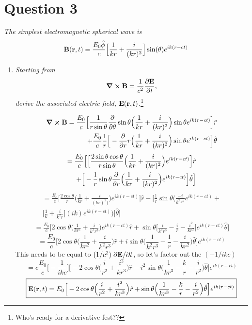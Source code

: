 \documentclass[12pt]{article}
\begin{document}
\begin{enumerate}[label=\alph*)]
\end{enumerate}

\newpage

\section*{Question 3}
{\sl The simplest electromagnetic spherical wave is}
\begin{equation}
\vb{B}(\vb{r}, t) = \frac{E_0 \hat{\phi}}{c}\Big[\frac{1}{kr} + \frac{i}{(kr)^2}\Big]\sin(\theta)e^{ik(r-ct)}
\label{eq:3.1}
\end{equation}

\begin{enumerate}[label=\alph*)]
\item {\sl Starting from }
\[\curl{\vb{B}}=\frac{1}{c^2}\pdv{\vb{E}}{t},\]
{\sl derive the associated electric field, $\vb{E}(\vb{r}, t)$.}\footnote{Who's ready for a derivative fest??}

\begin{align*}
\curl{\vb{B}} = \frac{E_0}{c}\Big[\frac{1}{r\sin\theta}\pdv{\theta} \sin\theta \Big(\frac{1}{kr}+ \frac{i}{(kr)^2}\Big)\sin\theta e^{ik(r-ct)}\Big]\hat{r} \\ + \frac{E_0}{c}\frac{1}{r}\Big[-\pdv{r} r \Big(\frac{1}{kr} + \frac{i}{(kr)^2}\Big)\sin\theta e^{ik(r-ct)}\Big]\hat{\theta}
\end{align*}
\begin{align*}
= \frac{E_0}{c}\Big[\Big[\frac{2\sin\theta \cos\theta}{r \sin\theta}\Big(\frac{1}{kr} + \frac{i}{(kr)^2}\Big)e^{ik(r-ct)}\Big]\hat{r} \\ 
\quad + \Big[-\frac{1}{r}\sin\theta \pdv{r} \Big(\frac{1}{kr} + \frac{i}{(kr)^2}\Big)e^{ik(r-ct)}\Big]\hat{\theta}\Big]
\end{align*}
\begin{align*}
=\frac{E_0}{c}\Big[\frac{2\cos\theta}{r}\Big(\frac{1}{kr} + \frac{i}{(kr)^2)}\Big)e^{ik(r-ct)}\Big]\hat{r} -\Big[\frac{1}{r}\sin\theta \Big(\frac{-i}{k^2r^2}e^{ik(r-ct)}+ \\ \Big[\frac{1}{k} + \frac{i}{k^2 r}\Big](ik)e^{ik(r-ct)}\Big)\Big]\hat{\theta}\Big]
\end{align*}
\begin{align*}
=\frac{E_0}{c}\Big[2\cos\theta\Big(\frac{1}{kr^2} + \frac{i}{k^2r^3}\Big)e^{ik(r-ct)}\hat{r}+ \sin\theta\Big[\frac{i}{k^2r^3} - \frac{i}{r}-\frac{i^2}{kr^2}\Big]e^{ik(r-ct)}\hat{\theta}\Big]
\end{align*}
\[= \frac{E_0}{c}\Big[2\cos\theta \Big(\frac{1}{kr^2} + \frac{i}{k^2r^3}\Big)\hat{r} + i\sin\theta \Big(\frac{1}{k^2r^3} - \frac{1}{r} - \frac{i}{kr^2}\Big)\hat{\theta}\Big]e^{ik(r-ct)}\]
This needs to be equal to $(1/c^2)\pdv*{\vb{E}}{t}$, so let's factor out the $(-1/ikc)$
\[= c\frac{E_0}{c}\Big[-\frac{1}{ikc}\Big]\Big[-2\cos\theta \Big(\frac{i}{r^2} + \frac{i^2}{kr^3}\Big)\hat{r} - i^2 \sin\theta \Big(\frac{1}{kr^3} - \frac{k}{r} - \frac{i}{r^2}\Big)\hat{\theta}\Big]e^{ik(r-ct)}\]
\[\boxed{\vb{E}(\vb{r}, t) = E_0\Big[-2\cos\theta \Big(\frac{i}{r^2} + \frac{i^2}{kr^3}\Big)\hat{r} + \sin\theta \Big(\frac{1}{kr^3} - \frac{k}{r} - \frac{i}{r^2}\Big)\hat{\theta}\Big]e^{ik(r-ct)}}\]


\end{enumerate}
\end{document}
